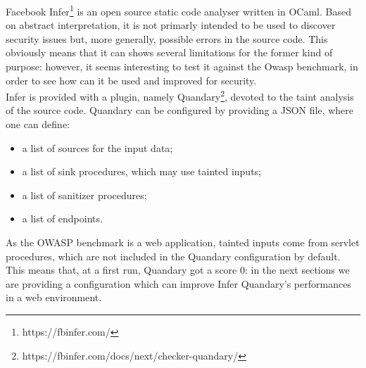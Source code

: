 \documentclass[../Report.tex]{subfiles}
\begin{document}
Facebook Infer\footnote{https://fbinfer.com/} is an open source static code analyser written in OCaml. Based on abstract interpretation, it is not primarly intended to be used to discover security issues but, more generally, possible errors in the source code. This obviously means that it can shows several limitations for the former kind of purpose: however, it seems interesting to test it against the Owasp benchmark, in order to see how can it be used and improved for security. \\
Infer is provided with a plugin, namely Quandary\footnote{https://fbinfer.com/docs/next/checker-quandary/}, devoted to the taint analysis of the source code. Quandary can be configured by providing a JSON file, where one can define:
\begin{itemize}
	\item a list of sources for the input data;
	\item a list of sink procedures, which may use tainted inputs;
	\item a list of sanitizer procedures;
	\item a list of endpoints.
\end{itemize}
As the OWASP benchmark is a web application, tainted inputs come from servlet procedures, which are not included in the Quandary configuration by default. This means that, at a first run, Quandary got a score 0: in the next sections we are providing a configuration which can improve Infer Quandary's performances in a web environment.
\end{document}
